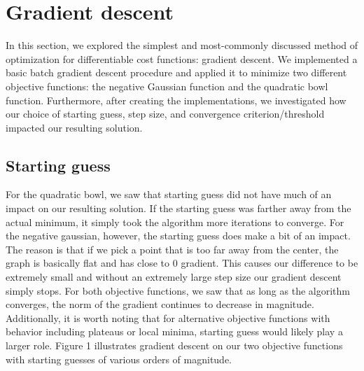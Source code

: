 \documentclass{article}
\begin{document}

\section{Gradient descent}

In this section, we explored the simplest and most-commonly discussed method of optimization for differentiable cost functions: gradient descent. We implemented a basic batch gradient descent procedure and applied it to minimize two different objective functions: the negative Gaussian function and the quadratic bowl function. Furthermore, after creating the implementations, we investigated how our choice of starting guess, step size, and convergence criterion/threshold impacted our resulting solution.

\subsection{Starting guess}
For the quadratic bowl, we saw that starting guess did not have much of an impact on our resulting solution. If the starting guess was farther away from the actual minimum, it simply took the algorithm more iterations to converge. For the negative gaussian, however, the starting guess does make a bit of an impact. The reason is that if we pick a point that is too far away from the center, the graph is basically flat and has close to 0 gradient. This causes our difference to be extremely small and without an extremely large step size our gradient descent simply stops. For both objective functions, we saw that as long as the algorithm converges, the norm of the gradient continues to decrease in magnitude. Additionally, it is worth noting that for alternative objective functions with behavior including plateaus or local minima, starting guess would likely play a larger role. Figure 1 illustrates gradient descent on our two objective functions with starting guesses of various orders of magnitude.
\end{document}
